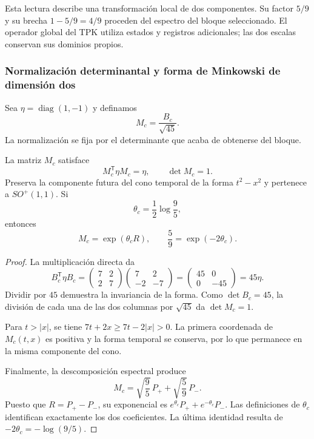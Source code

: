 Esta lectura describe una transformación local de dos componentes. Su factor $5/9$ y su brecha $1-5/9=4/9$ proceden del espectro del bloque seleccionado. El operador global del TPK utiliza estados y registros adicionales; las dos escalas conservan sus dominios propios.

\subsubsection{Normalización determinantal y forma de Minkowski de dimensión dos}

Sea $\eta=\operatorname{diag}(1,-1)$ y definamos
\[
 M_c=\frac{B_c}{\sqrt{45}}.
\]
La normalización se fija por el determinante que acaba de obtenerse del bloque.

\begin{teorema}
\label{geo:thm-lorentz}
La matriz $M_c$ satisface
\[
 M_c^{\mathsf T}\eta M_c=\eta,
 \qquad \det M_c=1.
\]
Preserva la componente futura del cono temporal de la forma $t^2-x^2$ y pertenece a $SO^+(1,1)$. Si
\[
 \theta_c=\frac12\log\frac95,
\]
entonces
\[
 M_c=\exp(\theta_cR),\qquad
 \frac59=\exp(-2\theta_c).
\]
\end{teorema}

\begin{proof}
La multiplicación directa da
\[
 B_c^{\mathsf T}\eta B_c
 =\begin{pmatrix}7&2\\2&7\end{pmatrix}
  \begin{pmatrix}7&2\\-2&-7\end{pmatrix}
 =\begin{pmatrix}45&0\\0&-45\end{pmatrix}
 =45\eta.
\]
Dividir por $45$ demuestra la invariancia de la forma. Como $\det B_c=45$, la división de cada una de las dos columnas por $\sqrt{45}$ da $\det M_c=1$.

Para $t>|x|$, se tiene $7t+2x\geq7t-2|x|>0$. La primera coordenada de $M_c(t,x)$ es positiva y la forma temporal se conserva, por lo que permanece en la misma componente del cono.

Finalmente, la descomposición espectral produce
\[
 M_c=\sqrt{\frac95}\,P_++\sqrt{\frac59}\,P_-.
\]
Puesto que $R=P_+-P_-$, su exponencial es $e^{\theta_c}P_++e^{-\theta_c}P_-$. Las definiciones de $\theta_c$ identifican exactamente los dos coeficientes. La última identidad resulta de $-2\theta_c=-\log(9/5)$.
\end{proof}

